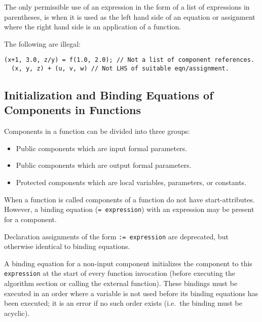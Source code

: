 The only permissible use of an expression in the form of a list of
expressions in parentheses, is when it is used as the left hand side of
an equation or assignment where the right hand side is an application of
a function.

\begin{example}
The following are illegal:
\begin{lstlisting}[language=modelica]
  (x+1, 3.0, z/y) = f(1.0, 2.0); // Not a list of component references.
  (x, y, z) + (u, v, w) // Not LHS of suitable eqn/assignment.
\end{lstlisting}
\end{example}

\subsection{Initialization and Binding Equations of Components in Functions}

Components in a function can be divided into three groups:
\begin{itemize}
\item
  Public components which are input formal parameters.
\item
  Public components which are output formal parameters.
\item
  Protected components which are local variables, parameters, or
  constants.
\end{itemize}

When a function is called components of a function do not have
start-attributes. However, a binding equation (\lstinline!= expression!) with
an expression may be present for a component.
\begin{nonnormative}
Declaration assignments of the form \lstinline!:= expression! are deprecated, but otherwise identical to binding equations.
\end{nonnormative}

A binding equation for a non-input component initializes the
component to this \lstinline!expression! at the start of every function invocation
(before executing the algorithm section or calling the external
function). These bindings must be executed in an order where a variable
is not used before its binding equations has been executed; it is
an error if no such order exists (i.e.\ the binding must be acyclic).

